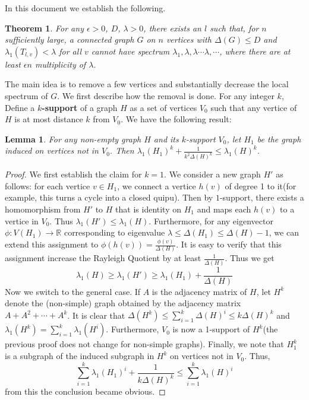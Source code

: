 \documentclass{article}
\theoremstyle{definition} %
\theoremstyle{plain} %
\newtheorem{theorem}{Theorem}
\newtheorem{lemma}{Lemma}
\begin{document}
In this document we establish the following.

\begin{theorem}
For any $\epsilon > 0$, $D$, $\lambda>0$, there exists an $l$ such that, for $n$ sufficiently large, a connected graph $G$ on $n$ vertices with $\Delta(G) \leq D$ and $\lambda_1(T_{l,v}) < \lambda$ for all $v$ cannot have spectrum $\lambda_1, \lambda, \lambda \cdots\lambda,\cdots$, where there are at least $\epsilon n$ multiplicity of $\lambda$.
\end{theorem}
The main idea is to remove a few vertices and substantially decrease the local spectrum of $G$. We first describe how the removal is done. For any integer $k$, Define a \textbf{$k$-support} of a graph $H$ as a set of vertices $V_0$ such that any vertice of $H$ is at most distance $k$ from $V_0$. We have the following result:
\begin{lemma}
For any non-empty graph $H$ and its $k$-support $V_0$, let $H_1$ be the graph induced on vertices not in $V_0$. Then $\lambda_1(H_1)^k + \frac{1}{k^2\Delta(H)^k}\leq \lambda_1(H)^k$.
\end{lemma}
\begin{proof}
We first establish the claim for $k=1$. We consider a new graph $H'$ as follows: for each vertice $v\in H_1$, we connect a vertice $h(v)$ of degree 1 to it(for example, this turns a cycle into a closed quipu). Then by $1$-support, there exists a homomorphism from $H'$ to $H$ that is identity on $H_1$ and maps each $h(v)$ to a vertice in $V_0$. Thus $\lambda_1(H') \leq \lambda_1(H)$. Furthermore, for any eigenvector $\phi: V(H_1) \to \mathbb{R}$ corresponding to eigenvalue $\lambda \leq \Delta(H_1) \leq \Delta(H) - 1$, we can extend this assignment to $\phi(h(v)) = \frac{\phi(v)}{\Delta(H)}$. It is easy to verify that this assignment increase the Rayleigh Quotient by at least $\frac{1}{\Delta(H)}$. Thus we get
$$\lambda_1(H) \geq \lambda_1(H') \geq \lambda_1(H_1) + \frac{1}{\Delta(H)}$$
Now we switch to the general case. If $A$ is the adjacency matrix of $H$, let $H^k$ denote the (non-simple) graph obtained by the adjacency matrix $A + A^2 + \cdots + A^k$. It is clear that $\Delta(H^k) \leq \sum_{i=1}^k\Delta(H)^i \leq k\Delta(H)^k$ and $\lambda_1(H^k) = \sum_{i=1}^k\lambda_1(H^i)$. Furthermore, $V_0$ is now a 1-support of $H^k$(the previous proof does not change for non-simple graphs). Finally, we note that $H_1^k$ is a subgraph of the induced subgraph in $H^k$ on vertices not in $V_0$. Thus,
$$\sum_{i=1}^k\lambda_1(H_1)^i  + \frac{1}{k\Delta(H)^k} \leq \sum_{i=1}^k\lambda_1(H)^i$$
from this the conclusion became obvious.
\end{proof}
\end{document}
